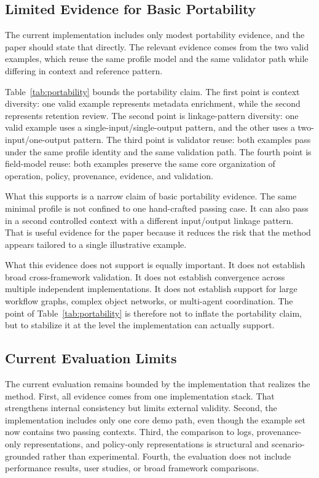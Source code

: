 \subsection{Limited Evidence for Basic Portability}

The current implementation includes only modest portability evidence, and the paper should state that directly. The relevant evidence comes from the two valid examples, which reuse the same profile model and the same validator path while differing in context and reference pattern.



Table~\ref{tab:portability} bounds the portability claim. The first point is context diversity: one valid example represents metadata enrichment, while the second represents retention review. The second point is linkage-pattern diversity: one valid example uses a single-input/single-output pattern, and the other uses a two-input/one-output pattern. The third point is validator reuse: both examples pass under the same profile identity and the same validation path. The fourth point is field-model reuse: both examples preserve the same core organization of operation, policy, provenance, evidence, and validation.

What this supports is a narrow claim of basic portability evidence. The same minimal profile is not confined to one hand-crafted passing case. It can also pass in a second controlled context with a different input/output linkage pattern. That is useful evidence for the paper because it reduces the risk that the method appears tailored to a single illustrative example.

What this evidence does not support is equally important. It does not establish broad cross-framework validation. It does not establish convergence across multiple independent implementations. It does not establish support for large workflow graphs, complex object networks, or multi-agent coordination. The point of Table~\ref{tab:portability} is therefore not to inflate the portability claim, but to stabilize it at the level the implementation can actually support.

\subsection{Current Evaluation Limits}

The current evaluation remains bounded by the implementation that realizes the method. First, all evidence comes from one implementation stack. That strengthens internal consistency but limits external validity. Second, the implementation includes only one core demo path, even though the example set now contains two passing contexts. Third, the comparison to logs, provenance-only representations, and policy-only representations is structural and scenario-grounded rather than experimental. Fourth, the evaluation does not include performance results, user studies, or broad framework comparisons.

